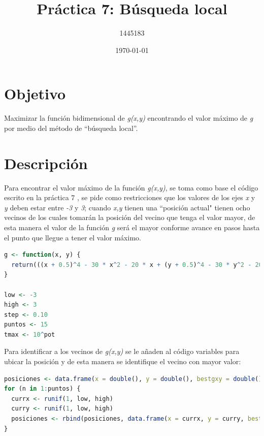 \documentclass{article}
\author{1445183}
\title{Práctica 7: Búsqueda local}
\date{\today}
\begin{document}
\maketitle

\section{Objetivo}
Maximizar la función bidimensional de \textit{g(x,y)} encontrando el valor máximo de \textit{g} por medio del método de ``búsqueda local''.

\section{Descripción}
 Para encontrar el valor máximo de la función \textit{g(x,y)}, se toma como base el código escrito en la práctica 7 \cite{elisaweb7}, se pide como restricciones que los valores de los ejes \textit{x} y \textit{y} deben estar entre \textit{-3} y \textit{3}; cuando \textit {x,y} tienen una ``posición actual"  tienen ocho vecinos de los cuales tomarán la posición del vecino que tenga el valor mayor, de esta manera el valor de la función \textit{g} será el mayor conforme avance en pasos hasta el punto que llegue a tener el valor máximo.

\begin{lstlisting}[language=R]
g <- function(x, y) {
  return(((x + 0.5)^4 - 30 * x^2 - 20 * x + (y + 0.5)^4 - 30 * y^2 - 20 * y)/100)
}

low <- -3
high <- 3
step <- 0.10
puntos <- 15
tmax <- 10^pot
\end{lstlisting}

Para identificar a los vecinos de \textit{g(x,y)} se le añaden al código variables para ubicar la posición y de esta manera se identifique el vecino con mayor valor:

\begin{lstlisting}[language=R]
posiciones <- data.frame(x = double(), y = double(), bestgxy = double())
for (n in 1:puntos) {
  currx <- runif(1, low, high)
  curry <- runif(1, low, high)
  posiciones <- rbind(posiciones, data.frame(x = currx, y = curry, bestgxy = g(currx, curry)))
}
\end{lstlisting}

\newpage
\end{document}
